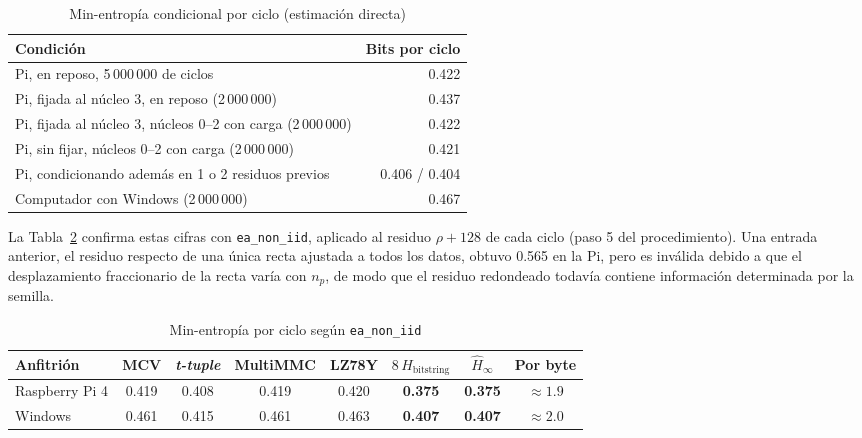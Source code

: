 \begin{table}[H]
\centering
\caption{Min-entropía condicional por ciclo (estimación directa)}
\label{tab:res_plugin}
\begin{tabularx}{\textwidth}{@{}Xr@{}}
\toprule
\textbf{Condición} & \textbf{Bits por ciclo} \\
\midrule
Pi, en reposo, 5\,000\,000 de ciclos & 0.422 \\
Pi, fijada al núcleo 3, en reposo (2\,000\,000) & 0.437 \\
Pi, fijada al núcleo 3, núcleos 0--2 con carga (2\,000\,000) & 0.422 \\
Pi, sin fijar, núcleos 0--2 con carga (2\,000\,000) & 0.421 \\
Pi, condicionando además en 1 o 2 residuos previos & 0.406 / 0.404 \\
Computador con Windows (2\,000\,000) & 0.467 \\
\bottomrule
\end{tabularx}
\end{table}

La Tabla~\ref{tab:res_nist_ciclo} confirma estas cifras con \texttt{ea\_non\_iid}, aplicado al residuo $\rho + 128$ de cada ciclo (paso 5 del procedimiento). Una entrada anterior, el residuo respecto de una única recta ajustada a todos los datos, obtuvo 0.565 en la Pi, pero es inválida debido a que el desplazamiento fraccionario de la recta varía con $n_p$, de modo que el residuo redondeado todavía contiene información determinada por la semilla.

\begin{table}[H]
\centering
\caption{Min-entropía por ciclo según \texttt{ea\_non\_iid}}
\label{tab:res_nist_ciclo}
\small
\begin{tabular}{@{}lccccccc@{}}
\toprule
\textbf{Anfitrión} & \textbf{MCV} & \textbf{\textit{t-tuple}} & \textbf{MultiMMC} & \textbf{LZ78Y} & \textbf{$8\,H_{\text{bitstring}}$} & \textbf{$\hat{H}_\infty$} & \textbf{Por byte} \\
\midrule
Raspberry Pi 4 & 0.419 & 0.408 & 0.419 & 0.420 & \textbf{0.375} & \textbf{0.375} & $\approx 1.9$ \\
Windows & 0.461 & 0.415 & 0.461 & 0.463 & \textbf{0.407} & \textbf{0.407} & $\approx 2.0$ \\
\bottomrule
\end{tabular}
\end{table}

